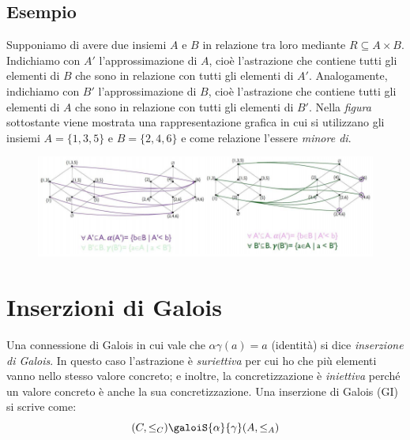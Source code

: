 \documentclass[a4paper,oneside,titlepage]{book}
\begin{document}
\subsection{Esempio}
Supponiamo di avere due insiemi $A$ e $B$ in relazione tra loro mediante $R \subseteq A \times B$. Indichiamo con $A'$ l'approssimazione di $A$, cioè l'astrazione che contiene tutti gli elementi di $B$ che sono in relazione con tutti gli elementi di $A'$. Analogamente, indichiamo con $B'$ l'approssimazione di $B$, cioè l'astrazione che contiene tutti gli elementi di $A$ che sono in relazione con tutti gli elementi di $B'$. Nella \textit{figura} sottostante viene mostrata una rappresentazione grafica in cui si utilizzano gli insiemi $A = \{ 1,3,5 \}$ e $B = \{ 2,4,6 \}$ e come relazione l'essere \textit{minore di}.
\begin{figure}[htp]
	\centering
	\includegraphics[width=\textwidth, height=\textheight, keepaspectratio]{galConn3.png}
\end{figure}


\section{Inserzioni di Galois} %
Una connessione di Galois in cui vale che $\alpha \gamma(a) = a$ (identità) si dice \textit{inserzione di Galois}. In questo caso l'astrazione è \textit{suriettiva} per cui ho che più elementi vanno nello stesso valore concreto; e inoltre, la concretizzazione è
\textit{iniettiva} perché un valore concreto è anche la sua concretizzazione. Una inserzione di Galois (GI) si scrive come:
\[
    (C, \leq_C) \galoiS{\alpha}{\gamma} (A, \leq_A)
\]
\end{document}
